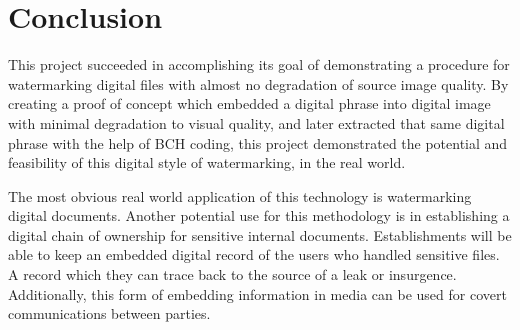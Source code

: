 \section{Conclusion}\label{sec:conc}
This project succeeded in accomplishing its goal of demonstrating a procedure for watermarking digital files with almost no degradation of source image quality.
By creating a proof of concept which embedded a digital phrase into digital image with minimal degradation to visual quality, and later extracted that same digital phrase with the help of BCH coding, this project demonstrated the potential and feasibility of this digital style of watermarking, in the real world.

The most obvious real world application of this technology is watermarking digital documents.
Another potential use for this methodology is in establishing a digital chain of ownership for sensitive internal documents.
Establishments will be able to keep an embedded digital record of the users who handled sensitive files. 
A record which they can trace back to the source of a leak or insurgence. Additionally, this form of embedding information in media can be used for covert communications between parties.
